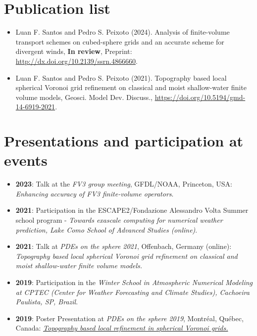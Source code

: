 \documentclass[letterpaper,11pt]{article}
\begin{document}
\section{Publication list}
\begin{itemize}
	\item Luan F. Santos and Pedro S. Peixoto (2024).
	{ Analysis of finite-volume transport schemes on cubed-sphere grids and an accurate scheme for divergent winds}, 
	{\bf In review}, Preprint: \href{http://dx.doi.org/10.2139/ssrn.4866660}{http://dx.doi.org/10.2139/ssrn.4866660}.
	\item Luan F. Santos and Pedro S. Peixoto (2021).
	{Topography based local spherical Voronoi grid refinement on classical and moist shallow-water finite volume models}, Geosci. Model Dev. Discuss., \href{https://doi.org/10.5194/gmd-14-6919-2021
	}{https://doi.org/10.5194/gmd-14-6919-2021}.
\end{itemize}




\section{Presentations and participation at events}
\begin{itemize}
	\item \textbf{2023}: Talk at the \textit{FV3 group meeting}, 
	GFDL/NOAA, Princeton, USA: \textit{Enhancing accuracy of FV3 finite-volume operators}.
	\item \textbf{2021}: Participation in the
    ESCAPE2/Fondazione Alessandro Volta  Summer school program -
    \textit{Towards exascale computing
	for numerical weather prediction, Lake Como School of Advanced Studies (online)}.
	\item \textbf{2021}: Talk at \textit{PDEs on the sphere 2021}, Offenbach, Germany (online): \textit{Topography based local spherical Voronoi grid refinement on classical and moist shallow-water finite volume models.} 
	\item \textbf{2019}: Participation in the \textit{Winter School in Atmospheric Numerical Modeling at CPTEC (Center for Weather Forecasting and Climate Studies), Cachoeira Paulista, SP, Brazil}.
	\item \textbf{2019}: Poster Presentation at \textit{PDEs on the sphere 2019}, Montréal, Québec, Canada:
	\textit{\href{https://collaboration.cmc.ec.gc.ca/science/pdes-2019/pdfs/poster-Luan-Santos.pdf}{Topography based local refinement in spherical Voronoi grids.}}
\end{itemize}
\end{document}
